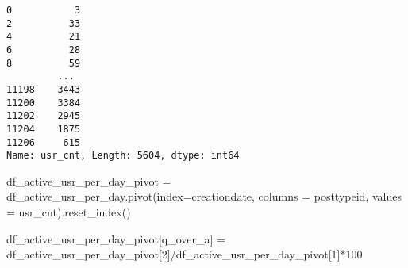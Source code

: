 \documentclass[
  letterpaper,
  DIV=11,
  numbers=noendperiod]{scrartcl}
\newenvironment{Shaded}{\begin{snugshade}}{\end{snugshade}}
\newcommand{\DecValTok}[1]{\textcolor[rgb]{0.68,0.00,0.00}{#1}}
\newcommand{\NormalTok}[1]{\textcolor[rgb]{0.00,0.23,0.31}{#1}}
\newcommand{\OperatorTok}[1]{\textcolor[rgb]{0.37,0.37,0.37}{#1}}
\newcommand{\StringTok}[1]{\textcolor[rgb]{0.13,0.47,0.30}{#1}}
\begin{document}
\begin{verbatim}
0           3
2          33
4          21
6          28
8          59
         ... 
11198    3443
11200    3384
11202    2945
11204    1875
11206     615
Name: usr_cnt, Length: 5604, dtype: int64
\end{verbatim}

\begin{Shaded}
\begin{Highlighting}[]
\NormalTok{df\_active\_usr\_per\_day\_pivot }\OperatorTok{=}\NormalTok{ df\_active\_usr\_per\_day.pivot(index}\OperatorTok{=}\StringTok{\textquotesingle{}creationdate\textquotesingle{}}\NormalTok{, columns }\OperatorTok{=} \StringTok{\textquotesingle{}posttypeid\textquotesingle{}}\NormalTok{, values }\OperatorTok{=} \StringTok{\textquotesingle{}usr\_cnt\textquotesingle{}}\NormalTok{).reset\_index()}
\end{Highlighting}
\end{Shaded}

\begin{Shaded}
\begin{Highlighting}[]
\NormalTok{df\_active\_usr\_per\_day\_pivot[}\StringTok{\textquotesingle{}q\_over\_a\textquotesingle{}}\NormalTok{] }\OperatorTok{=}\NormalTok{ df\_active\_usr\_per\_day\_pivot[}\StringTok{\textquotesingle{}2\textquotesingle{}}\NormalTok{]}\OperatorTok{/}\NormalTok{df\_active\_usr\_per\_day\_pivot[}\StringTok{\textquotesingle{}1\textquotesingle{}}\NormalTok{]}\OperatorTok{*}\DecValTok{100}
\end{Highlighting}
\end{Shaded}
\end{document}
